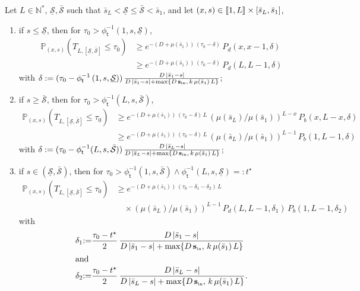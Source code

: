 \documentclass[AHL,Unicode,longabstracts,published]{cedram}
\newcommand{\llbracket}{\mathopen{[\mkern -2.7mu[}}
\newcommand{\rrbracket}{\mathclose{]\mkern -2.7mu]}}
\newcommand{\PP}{\mathbb{P}}
\newcommand{\NN}{\mathbb{N}}
\newcommand{\Sin}{{\mathbf s}_{\textrm{\tiny\rm in}}}
\newcommand{\Smin}{\underline{\mathcal{S}}}
\newcommand{\Smax}{\bar{\mathcal{S}}}
\newcommand{\barmu}{\mu(\bar s_1)}
\newcommand{\phit}{\phi_\textsf{t}^{-1}}
\newcommand{\1}{\mathbf{1}}
\begin{document}
\begin{lemm}\label{lemma.reach.T.Smin.Smax}
Let $L \in \NN^*$, $\Smin,\Smax$ such that $\bar s_L<\Smin\leq\Smax<\bar s_1$, and let $(x,s)\in \llbracket 1, L\rrbracket \times [\bar s_L,\bar s_1]$,
\begin{enumerate}
\item \label{lemma.reach.T.Smin.Smax.s_inf_Smin}
if $s\leq \Smin$, then for $\tau_0>\phit(1, s,\Smin)$,
\begin{align*}
\PP_{(x,s)}\left(T_{L,[\Smin,\Smax]}\leq \tau_0\right) &\geq e^{-(D+\barmu)\,(\tau_0-\delta)}\,P_d(x,x-1,\delta)\\
&\geq e^{-(D+\barmu)\,(\tau_0-\delta)}\,P_d(L,L-1,\delta)
\end{align*}
with $\delta:=(\tau_0-\phit\left(1, s,\Smin\right))\,\frac{D\,|\bar s_1-s|}{D\,|\bar s_1-s|+\max\{D\,\Sin,\,k\,\barmu\,L\}}$;

\item \label{lemma.reach.T.Smin.Smax.s_sup_Smax}
if $s\geq\Smax$, then for $\tau_0>\phit(L, s,\Smax)$,
\begin{align*}
\PP_{(x,s)}\left(T_{L,[\Smin,\Smax]}\leq \tau_0\right) &\geq e^{-(D+\barmu)\,(\tau_0-\delta)\,L}\,\left(\mu(\bar s_L)/\barmu\right)^{L-x}\, P_b(x,L-x, \delta)
\\
&\geq e^{-(D+\barmu)\,(\tau_0-\delta)\,L}\,
\left(\mu(\bar s_L)/\barmu\right)^{L-1}\,P_b(1,L-1, \delta)
\end{align*}
with $\delta:=(\tau_0-\phit(L, s,\Smax))\,\frac{D\,|\bar s_L-s|}{D\,|\bar s_L-s|+\max\{D\,\Sin,\,k\,\barmu\,L\}}$;

\item \label{lemma.reach.T.Smin.Smax.s_in_Smin_Smax}
if $s\in (\Smin,\Smax)$, then for $\tau_0>\phit(1, s,\Smax) \wedge \phit(L, s,\Smin)=:t^\star$
\begin{align*}
\PP_{(x,s)}\left(T_{L,[\Smin,\Smax]}\leq \tau_0\right) &\geq e^{-(D+\barmu)\,\left(\tau_0-\delta_1-\delta_2\right)\,L}\\
& \quad\times(\mu(\bar s_L)/\barmu)^{L-1}\,P_d(L,L-1, \delta_1)\, P_b(1,L-1, \delta_2)
\end{align*}
with 
\begin{align*}
\delta_1 &{:=}\frac{\tau_0-t^\star}{2}\,\frac{D\,|\bar s_1-s|}{D\,|\bar s_1-s|+\max\{D\,\Sin,\,k\,\barmu\,L\}}\\
\intertext{and}
\delta_2 &{:=}\frac{\tau_0-t^\star}{2}\,\frac{D\,|\bar s_L-s|}{D\,|\bar s_L-s|+\max\{D\,\Sin,\,k\,\barmu\,L\}}.
\end{align*}
\end{enumerate}
\end{lemm}
\end{document}
